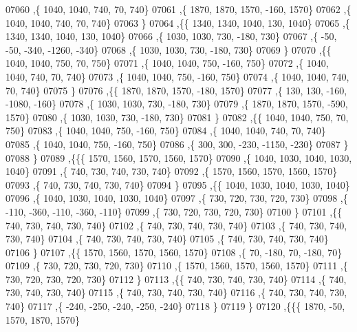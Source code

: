\begin{DoxyCode}
07060     ,\{  1040,  1040,   740,    70,   740\}
07061     ,\{  1870,  1870,  1570,  -160,  1570\}
07062     ,\{  1040,  1040,   740,    70,   740\}
07063     \}
07064    ,\{\{  1340,  1340,  1040,   130,  1040\}
07065     ,\{  1340,  1340,  1040,   130,  1040\}
07066     ,\{  1030,  1030,   730,  -180,   730\}
07067     ,\{   -50,   -50,  -340, -1260,  -340\}
07068     ,\{  1030,  1030,   730,  -180,   730\}
07069     \}
07070    ,\{\{  1040,  1040,   750,    70,   750\}
07071     ,\{  1040,  1040,   750,  -160,   750\}
07072     ,\{  1040,  1040,   740,    70,   740\}
07073     ,\{  1040,  1040,   750,  -160,   750\}
07074     ,\{  1040,  1040,   740,    70,   740\}
07075     \}
07076    ,\{\{  1870,  1870,  1570,  -180,  1570\}
07077     ,\{   130,   130,  -160, -1080,  -160\}
07078     ,\{  1030,  1030,   730,  -180,   730\}
07079     ,\{  1870,  1870,  1570,  -590,  1570\}
07080     ,\{  1030,  1030,   730,  -180,   730\}
07081     \}
07082    ,\{\{  1040,  1040,   750,    70,   750\}
07083     ,\{  1040,  1040,   750,  -160,   750\}
07084     ,\{  1040,  1040,   740,    70,   740\}
07085     ,\{  1040,  1040,   750,  -160,   750\}
07086     ,\{   300,   300,  -230, -1150,  -230\}
07087     \}
07088    \}
07089   ,\{\{\{  1570,  1560,  1570,  1560,  1570\}
07090     ,\{  1040,  1030,  1040,  1030,  1040\}
07091     ,\{   740,   730,   740,   730,   740\}
07092     ,\{  1570,  1560,  1570,  1560,  1570\}
07093     ,\{   740,   730,   740,   730,   740\}
07094     \}
07095    ,\{\{  1040,  1030,  1040,  1030,  1040\}
07096     ,\{  1040,  1030,  1040,  1030,  1040\}
07097     ,\{   730,   720,   730,   720,   730\}
07098     ,\{  -110,  -360,  -110,  -360,  -110\}
07099     ,\{   730,   720,   730,   720,   730\}
07100     \}
07101    ,\{\{   740,   730,   740,   730,   740\}
07102     ,\{   740,   730,   740,   730,   740\}
07103     ,\{   740,   730,   740,   730,   740\}
07104     ,\{   740,   730,   740,   730,   740\}
07105     ,\{   740,   730,   740,   730,   740\}
07106     \}
07107    ,\{\{  1570,  1560,  1570,  1560,  1570\}
07108     ,\{    70,  -180,    70,  -180,    70\}
07109     ,\{   730,   720,   730,   720,   730\}
07110     ,\{  1570,  1560,  1570,  1560,  1570\}
07111     ,\{   730,   720,   730,   720,   730\}
07112     \}
07113    ,\{\{   740,   730,   740,   730,   740\}
07114     ,\{   740,   730,   740,   730,   740\}
07115     ,\{   740,   730,   740,   730,   740\}
07116     ,\{   740,   730,   740,   730,   740\}
07117     ,\{  -240,  -250,  -240,  -250,  -240\}
07118     \}
07119    \}
07120   ,\{\{\{  1870,   -50,  1570,  1870,  1570\}

\end{DoxyCode}
